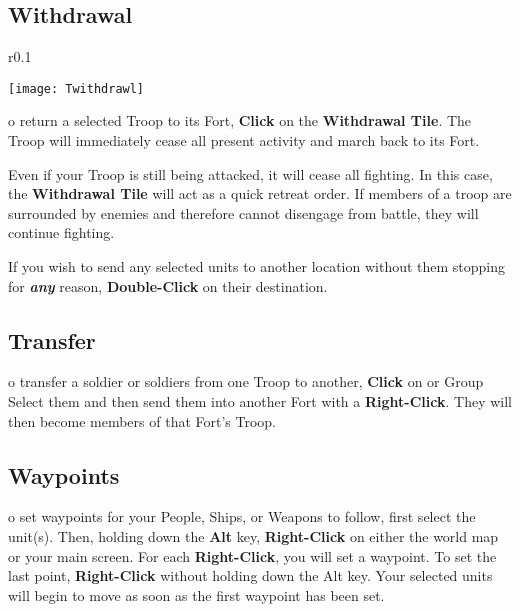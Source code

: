 \subsection{Withdrawal}


\begin{wrapfigure}{r}{0.1\textwidth}
    \vspace{-20pt}
    \begin{center}
        \texttt{[image: Twithdrawl]}
    \end{center}
    \vspace{-20pt}
\end{wrapfigure}

o return a selected Troop to its Fort, \textbf{Click} on the \textbf{Withdrawal Tile}. The Troop will immediately cease all present activity and march back to its Fort.

Even if your Troop is still being attacked, it will cease all fighting. In this case, the \textbf{Withdrawal Tile} will act as a quick retreat order. If members of a troop are surrounded by enemies and therefore cannot disengage from battle, they will continue fighting.

If you wish to send any selected units to another location without them stopping for \textbf{\textit{any}} reason, \textbf{Double-Click} on their destination.

\subsection{Transfer}


o transfer a soldier or soldiers from one Troop to another, \textbf{Click} on or Group Select them and then send them into another Fort with a \textbf{Right-Click}. They will then become members of that Fort’s Troop.

\subsection{Waypoints}


o set waypoints for your People, Ships, or Weapons to follow, first select the unit(s). Then, holding down the \textbf{Alt} key, \textbf{Right-Click} on either the world map or your main screen. For each \textbf{Right-Click}, you will set a waypoint. To set the last point, \textbf{Right-Click} without holding down the Alt key. Your selected units will begin to move as soon as the first waypoint has been set.

